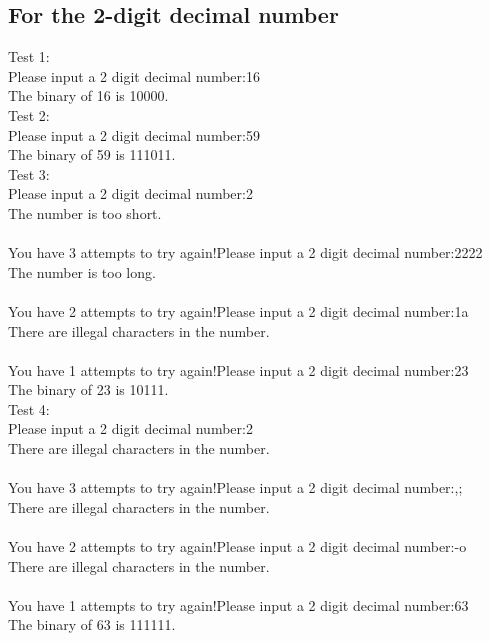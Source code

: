 \documentclass[12pt]{article}
\begin{document}
	\subsection{For the 2-digit decimal number}
	\noindent Test 1:\\
	Please input a 2 digit decimal number:16\\
	The binary of 16 is 10000.\\
	
	\noindent Test 2:\\
	Please input a 2 digit decimal number:59\\
	The binary of 59 is 111011.\\
	
	\noindent Test 3:\\
	Please input a 2 digit decimal number:2\\
	The number is too short.\\\\	
	You have 3 attempts to try again!Please input a 2 digit decimal number:2222\\
	The number is too long.\\\\	
	You have 2 attempts to try again!Please input a 2 digit decimal number:1a\\
	There are illegal characters in the number.\\\\	
	You have 1 attempts to try again!Please input a 2 digit decimal number:23\\
	The binary of 23 is 10111.\\
	
	\noindent Test 4:\\
	Please input a 2 digit decimal number:2\\
	There are illegal characters in the number.\\\\	
	You have 3 attempts to try again!Please input a 2 digit decimal number:,;\\
	There are illegal characters in the number.\\\\	
	You have 2 attempts to try again!Please input a 2 digit decimal number:-o\\
	There are illegal characters in the number.\\\\	
	You have 1 attempts to try again!Please input a 2 digit decimal number:63\\
	The binary of 63 is 111111.\\
	
\end{document}
